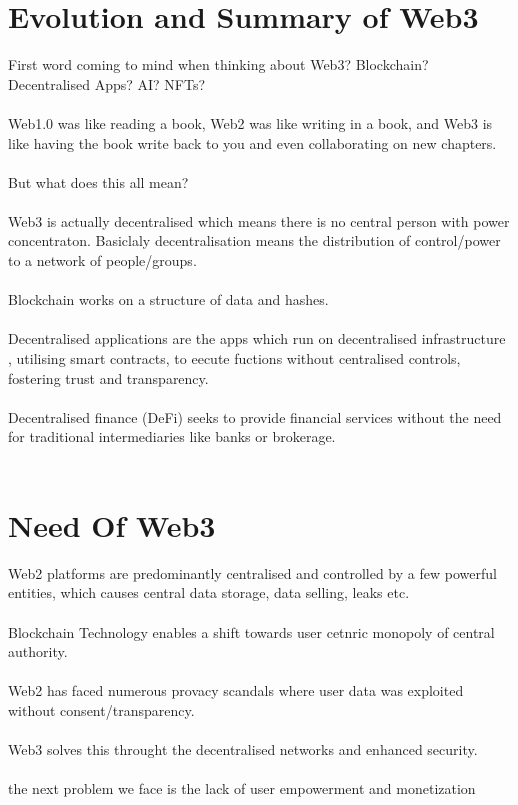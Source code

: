 \documentclass[a4paper,30pt]{report}
\begin{document}
      \section{Evolution and Summary of Web3} 
          First word coming to mind when thinking about Web3? Blockchain? Decentralised Apps? AI? NFTs?\\\\
          Web1.0 was like reading a book, Web2 was like writing in a book, and Web3 is like having the book write back to you and even collaborating on new chapters.\\\\ 
          But what does this all mean?\\\\ 
          Web3 is actually decentralised which means there is no central person with power concentraton. Basiclaly decentralisation means the distribution of control/power to a network of people/groups.\\\\ 
          Blockchain works on a structure of data and hashes.\\\\ 
          Decentralised applications are the apps which run on decentralised infrastructure , utilising smart contracts, to eecute fuctions without centralised controls, fostering trust and transparency.\\\\
          Decentralised finance (DeFi) seeks to provide financial services without the need for traditional intermediaries like banks or brokerage.\\\\ 

      \section{Need Of Web3} 
          Web2 platforms are predominantly centralised and controlled by a few powerful entities, which causes central data storage, data selling, leaks etc.\\\\ 
          Blockchain Technology enables a shift towards user cetnric monopoly of central authority.\\\\ 
          Web2 has faced numerous provacy scandals where user data was exploited without consent/transparency.\\\\
          Web3 solves this throught the decentralised networks and enhanced security.\\\\
          the next problem we face is the lack of user empowerment and monetization\\\\
\end{document}
